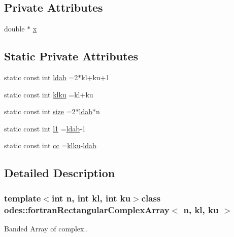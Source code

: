 \subsection*{Private Attributes}
\begin{DoxyCompactItemize}
\item 
double $\ast$ \hyperlink{classodes_1_1fortranRectangularComplexArray_a04409d9c6123c7ab97b2c9599ddec0cd}{x}
\end{DoxyCompactItemize}
\subsection*{Static Private Attributes}
\begin{DoxyCompactItemize}
\item 
static const int \hyperlink{classodes_1_1fortranRectangularComplexArray_a44b92ded1ed0bf332322a6f4ed439db5}{ldab} =2$\ast$kl+ku+1
\item 
static const int \hyperlink{classodes_1_1fortranRectangularComplexArray_a0ec73fecad411a352df4b99c247780ca}{klku} =kl+ku
\item 
static const int \hyperlink{classodes_1_1fortranRectangularComplexArray_a92dd60f10c597b14d4a38502ab291cba}{size} =2$\ast$\hyperlink{classodes_1_1fortranRectangularComplexArray_a44b92ded1ed0bf332322a6f4ed439db5}{ldab}$\ast$n
\item 
static const int \hyperlink{classodes_1_1fortranRectangularComplexArray_a0b1f7b8193f5ee24cfde0c6953aee714}{l1} =\hyperlink{classodes_1_1fortranRectangularComplexArray_a44b92ded1ed0bf332322a6f4ed439db5}{ldab}-\/1
\item 
static const int \hyperlink{classodes_1_1fortranRectangularComplexArray_a527c968c7a1db51e34a8c5a1c65192fb}{cc} =\hyperlink{classodes_1_1fortranRectangularComplexArray_a0ec73fecad411a352df4b99c247780ca}{klku}-\/\hyperlink{classodes_1_1fortranRectangularComplexArray_a44b92ded1ed0bf332322a6f4ed439db5}{ldab}
\end{DoxyCompactItemize}


\subsection{Detailed Description}
\subsubsection*{template$<$int n, int kl, int ku$>$class odes\+::fortran\+Rectangular\+Complex\+Array$<$ n, kl, ku $>$}

Banded Array of complex.. 

